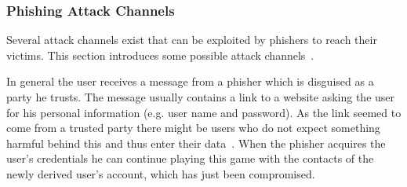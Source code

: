 \subsubsection{Phishing Attack Channels}
Several attack channels exist that can be exploited by phishers to reach their victims.
 This section introduces some possible attack channels~\cite{phishing2010ramazan, phishingtechniques}.
 
In general the user receives a message from a phisher which is disguised as a party he trusts.
The message usually contains a link to a website asking the user for his personal information (e.g. user name and password). As the link seemed to come from a trusted party there might be users who do not expect something harmful behind this and thus enter their data~\cite{phishing2010ramazan}.
When the phisher acquires the user's credentials he can continue playing this game with the contacts of the newly derived user's account, which has just been compromised.
 
